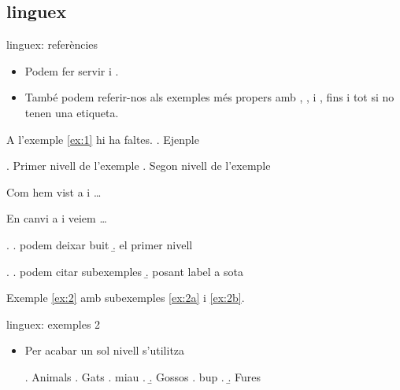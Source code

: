 \subsection{linguex}
\begin{frame}[fragile]{linguex: referències}
\begin{itemize}
\item Podem fer servir  i .
\item També podem referir-nos als exemples més propers amb , ,  i , fins i tot si no tenen una etiqueta.
\end{itemize}
\begin{exampletwouptiny2}
A l'exemple \ref{ex:1} hi ha faltes. 
\ex. Ejenple
\label{ex:1}

\ex. Primer nivell de l'exemple
\a. Segon nivell de l'exemple

Com hem vist a \LLast i \Last \dots

En canvi a \Next i \NNext veiem \dots

\ex.
\a. podem deixar buit
\b. el primer nivell

\ex. 
\label{ex:2}
\a. podem citar subexemples 
\label{ex:2a}
\b. posant label a sota 
\label{ex:2b}

Exemple \ref{ex:2} amb subexemples 
\ref{ex:2a} i \ref{ex:2b}.

\end{exampletwouptiny2}
\end{frame}

\begin{frame}[fragile]{linguex: exemples 2}
\begin{itemize}
\item Per acabar un sol nivell s'utilitza 
\begin{exampletwouptiny2}
\ex. Animals
\a. Gats
\a. miau
\z.
\b. Gossos
\a. bup
\z.
\b. Fures

\end{exampletwouptiny2}
\end{itemize}

\end{frame}

